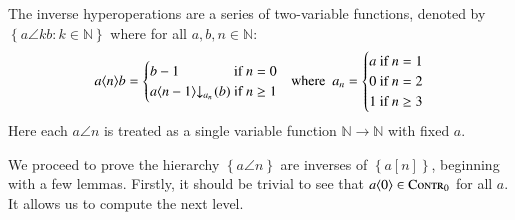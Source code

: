 \begin{defn} \label{defn: inv-hyperop}
	The inverse hyperoperations are a series of two-variable functions, denoted by $\left\{a\angle{k}b : k\in \mathbb{N}\right\}$ where for all $a, b, n\in \mathbb{N}$:
	\begin{equation}
	a\angle{n}b = \begin{cases}
	b - 1 & \hspace{-10pt}\text{ if } n = 0 \\
	\cdt{a\angle{n-1}}{a_n}(b) & \hspace{-10pt}\text{ if } n \ge 1
	\end{cases}
	\ \ \text{ where } \ a_n = \begin{cases}
	a & \hspace{-10pt}\text{ if } n = 1 \\
	0 & \hspace{-10pt}\text{ if } n = 2 \\
	1 & \hspace{-10pt}\text{ if } n \ge 3
	\end{cases}
	\end{equation}
	Here each $a\angle{n}$ is treated as a single variable function $\mathbb{N}\to \mathbb{N}$ with fixed $a$.
\end{defn}
We proceed to prove the hierarchy $\left\{a\angle{n}\right\}$ are inverses of $\left\{a[n]\right\}$, beginning with a few lemmas. Firstly, it should be trivial to see that $a\langle 0\rangle\in \text{\scshape{Contr}}_0$ for all $a$. It allows us to compute the next level.

